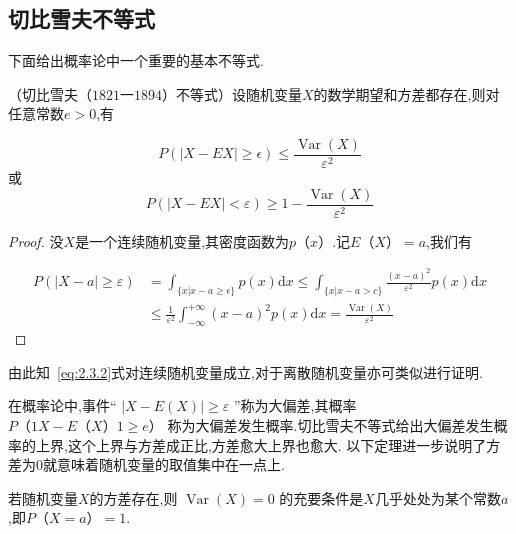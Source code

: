 \subsection{切比雪夫不等式}

下面给出概率论中一个重要的基本不等式.

\begin{theorem}
	（切比雪夫$ （1821一1894） $不等式）设随机变量$ X $的数学期望和方差都存在,则对任意常数$ e>0 $,有
	
	\begin{equation}
	P(|X-E X| \geqslant \epsilon) \leqslant \frac{\operatorname{Var}(X)}{\varepsilon^{2}} \label{eq:2.3.2}
	\end{equation}
	或
	\begin{equation}
	P(|X-E X|<\varepsilon) \geqslant 1-\frac{\operatorname{Var}(X)}{\varepsilon^{2}} \label{eq:2.3.3}
	\end{equation}
\end{theorem}

\begin{proof}
	没$ X $是一个连续随机变量,其密度函数为$ p（x） $.记$ E（X）=a $,我们有
	
	\[
	\begin{array}{ll}
	{P(|X-a| \geqslant \varepsilon)} & {=\int_{\{x | x-a \geq \epsilon\}} p(x) \mathrm{d} x \leq \int_{\{x | x-a>c\}} \frac{(x-a)^{2}}{\varepsilon^{2}} p(x) \mathrm{d} x} \\ 
	{} & {\leqslant \frac{1}{\varepsilon^{2}} \int_{-\infty}^{+\infty}(x-a)^{2} p(x) \mathrm{d} x=\frac{\operatorname{Var}(X)}{\varepsilon^{2}}}
	\end{array}
	\] 
\end{proof}

由此知~\ref{eq:2.3.2}式对连续随机变量成立,对于离散随机变量亦可类似进行证明.

在概率论中,事件“ $|X-E(X)| \geqslant \varepsilon$ ”称为大偏差,其概率 $ P（1X-E（X）1 \geqslant e） $ 称为大偏差发生概率.切比雪夫不等式给出大偏差发生概率的上界,这个上界与方差成正比,方差愈大上界也愈大.
以下定理进一步说明了方差为0就意味着随机变量的取值集中在一点上.

\begin{theorem}
	若随机变量$ X $的方差存在,则 $\operatorname{Var}(X)=0$ 的充要条件是$ X $几乎处处为某个常数$ a $,即$ P（X=a）=1 $.
\end{theorem}

